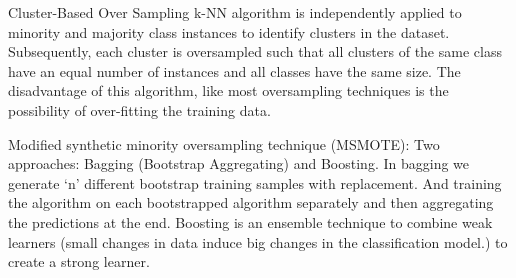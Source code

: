 \documentclass[11pt]{article}
\theoremstyle{definition}
\theoremstyle{remark}
\begin{document}
Cluster-Based Over Sampling k-NN algorithm is independently applied to minority and majority class instances to identify clusters in the dataset. Subsequently, each cluster is oversampled such that all clusters of the same class have an equal number of instances and all classes have the same size. The disadvantage of this algorithm, like most oversampling techniques is the possibility of over-fitting the training data.  

Modified synthetic minority oversampling technique (MSMOTE): Two approaches: Bagging (Bootstrap Aggregating) and Boosting. In bagging we generate ‘n’ different bootstrap training samples with replacement. And training the algorithm on each bootstrapped algorithm separately and then aggregating the predictions at the end. 
Boosting is an ensemble technique to combine weak learners (small changes in data induce big changes in the classification model.) to create a strong learner. 

\newpage





\end{document}
